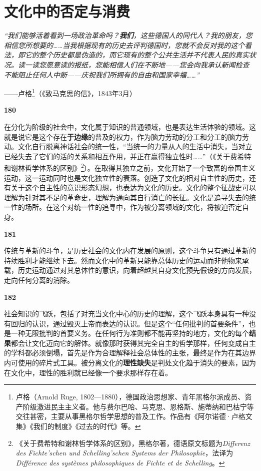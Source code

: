 \documentclass[fontset=fandol, a4paper, 12pt, openright]{ctexbook}
\makeatletter
\renewenvironment{quote}
  {\list{}{\rightmargin\leftmargin}%
   \item\relax\small\itshape\color{darkgray}}
  {\endlist}
\newcommand{\thesis}[1]{%
    \par\vspace{1.5em}%
    {\centering \textbf{\Large #1}\par}%
    \nobreak\vspace{0.5em}\nobreak
    \@afterindenttrue %
    \@afterheading    %
}
\makeatother
\begin{document}
\chapter{文化中的否定与消费}

\begin{quote}
“我们能够活着看到一场政治革命吗？\textbf{我们}，这些德国人的同代人？我的朋友，您相信您所想要的……当我根据现有的历史去评判德国时，您就不会反对我的这个看法，即它的整个历史都是伪造的，而它现有的整个公共生活并不代表人民的真实状况。读一读您愿意读的报纸，您能相信人们在不断地——您会向我承认新闻检查不能阻止任何人中断——庆祝我们所拥有的自由和国家幸福……”

\begin{flushright}
——卢格\footnote{卢格（Arnold Ruge, 1802—1880），德国政治思想家、青年黑格尔派成员、资产阶级激进民主主义者。他与费尔巴哈、马克思、恩格斯、施蒂纳和巴枯宁等交往甚密，主要从事黑格尔哲学思想的普及工作。作品有《阿尔诺德·卢格文集》《我们的制度》《过去的时代》等。}（《致马克思的信》，1843年3月）
\end{flushright}
\end{quote}

\thesis{180}
在分化为阶级的社会中，文化属于知识的普通领域，也是表达生活体验的领域。这就是说它是这个存在\textbf{于边缘}的普及的权力，作为脑力劳动的分工和分工的脑力劳动。文化自行脱离神话社会的统一性，“当统一的力量从人的生活中消失，当对立已经失去了它们的活的关系和相互作用，并正在赢得独立性时……”（《关于费希特和谢林哲学体系的区别》\footnote{《关于费希特和谢林哲学体系的区别》，黑格尔著，德语原文标题为\textit{Differenz des Fichte'schen und Schelling'schen Systems der Philosophie}，法译为\textit{Différence des systèmes philosophiques de Fichte et de Schelling}。}）。在取得其独立之前，文化开始了一个致富的帝国主义运动，这一运动同时也是文化独立性的衰落。创造了文化的相对自主性的历史，还有关于这个自主性的意识形态幻想，也表达为文化的历史。文化的整个征战史可以理解为针对其不足的革命史，理解为通向其自行消亡的长征。文化是追寻失去的统一性的场所。在这个对统一性的追寻中，作为被分离领域的文化，将被迫否定自身。

\thesis{181}
传统与革新的斗争，是历史社会的文化内在发展的原则，这个斗争只有通过革新的持续胜利才能继续下去。然而文化中的革新只能靠总体历史的运动而非他物来承载，历史运动通过对其总体性的意识，向着超越其自身文化预先假设的方向发展，走向任何分离的消除。

\thesis{182}
社会知识的飞跃，包括了对充当文化中心的历史的理解，这个飞跃本身具有一种没有回归的认识，通过毁灭上帝而表达的认识。但是这个“任何批判的首要条件”，也是一种无限批判的首要义务。在任何行为准则都不能再坚持的地方，文化的每个\textbf{结果}都会让文化迈向它的解体。就像那时获得其完全自主的哲学那样，任何变成自主的学科都必须倒塌，首先是作为合理解释社会总体性的主张，最终是作为在其边界内可使用的碎片式工具。被分离文化的\textbf{理性缺失}是判处文化趋于消失的要素，因为在文化中，理性的胜利就已经像一个要求那样存在着。
\end{document}
